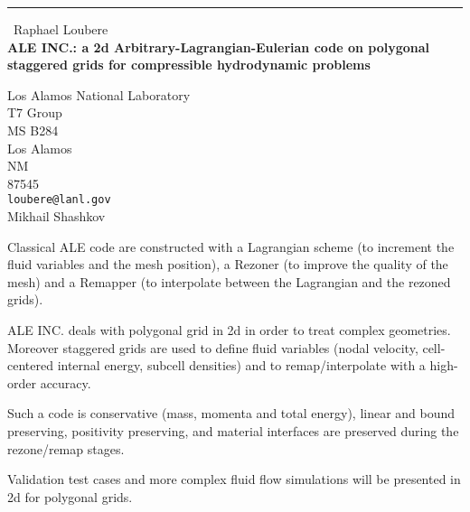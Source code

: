 \documentclass{report}
\begin{document}
\begin{center}
\rule{6in}{1pt} \
{\large Raphael Loubere \\
{\bf ALE INC.: a 2d Arbitrary-Lagrangian-Eulerian code on polygonal staggered grids for compressible hydrodynamic problems}}

Los Alamos National Laboratory \\ T7 Group  \\ MS B284 \\ Los Alamos \\ NM \\ 87545
\\
{\tt loubere@lanl.gov}\\
Mikhail Shashkov\end{center}

Classical ALE code are constructed with a Lagrangian scheme (to increment
the fluid variables and the mesh position),
a Rezoner (to improve the quality of the mesh) and a Remapper (to
interpolate between the Lagrangian and the rezoned grids).

ALE INC. deals with polygonal grid in 2d in order to treat complex
geometries. Moreover staggered grids are used to define
fluid variables (nodal velocity, cell-centered internal energy, subcell
densities) and to remap/interpolate with a high-order
accuracy.

Such a code is conservative (mass, momenta and total energy), linear and
bound preserving, positivity preserving,
and material interfaces are preserved during the rezone/remap stages.

Validation test cases and more complex fluid flow simulations
will be presented in 2d for polygonal grids.
\end{document}
